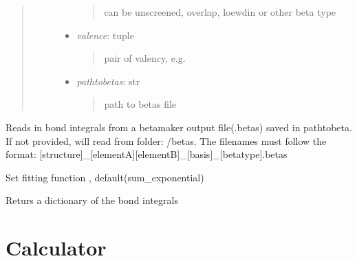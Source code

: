 \documentclass[letterpaper,10pt,english]{sphinxmanual}
\begin{document}
\begin{fulllineitems}
\begin{quote}
\begin{description}
\begin{itemize}
\begin{quote}
can be unscreened, overlap, loewdin or other beta type
\end{quote}

\item {} 
\emph{valence}: tuple
\begin{quote}

pair of valency, e.g. 
\end{quote}

\item {} 
\emph{pathtobetas}: str
\begin{quote}

path to betas file
\end{quote}

\end{itemize}

\end{description}\end{quote}

\begin{fulllineitems}
\label{classes:beta.Beta.read_betas}
Reads in bond integrals from a betamaker output file(.betas) 
saved in pathtobeta. If not provided, will read from folder:
/betas. The filenames must follow the format: 
{[}structure{]}\_{[}elementA{]}{[}elementB{]}\_{[}basis{]}\_{[}betatype{]}.betas

\end{fulllineitems}


\begin{fulllineitems}
\label{classes:beta.Beta.set_fitfuncs}
Set fitting function , default(sum\_exponential)

\end{fulllineitems}


\begin{fulllineitems}
\label{classes:beta.Beta.zip_betas}
Returs a dictionary of the bond integrals

\end{fulllineitems}


\end{fulllineitems}



\section{Calculator}
\label{classes:calculator}\label{classes:module-catcalc}
\end{document}
